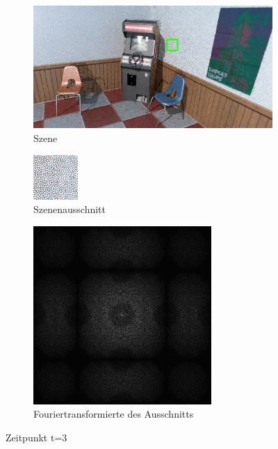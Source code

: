 \begin{figure}[H]
    \begin{subfigure}{\textwidth}
        \centering \includegraphics[scale=.25]{content/TemporalerAlg/Bilder/Sorting/Szene/Szene3.png}
        \caption{Szene}
        \label{fig:Nur_Sorting_Szene_t3}
    \end{subfigure}
    \begin{subfigure}{0.5\textwidth}
        \centering\includegraphics[width=0.4\linewidth]{content/TemporalerAlg/Bilder/Sorting/Ausschnitte/Ausschnitt3.png} 
        \caption{Szenenausschnitt}
        \label{fig:Nur_Sorting_ausschnitt_t3}
    \end{subfigure}
    \begin{subfigure}{0.5\textwidth}
        \centering\includegraphics[width=0.4\linewidth]{content/TemporalerAlg/Bilder/Sorting/Spektren/Ausschnitt3.png}
        \caption{Fouriertransformierte des Ausschnitts}
        \label{fig:Nur_Sorting_Fouriertransformierte_t3}
    \end{subfigure}
        \caption{Zeitpunkt t=3}
        \label{fig:Nur_Sorting_Verlauf_t3}
\end{figure}

